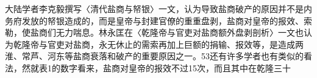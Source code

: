 \vfill
\begin{BookNotes}
\end{BookNotes}



大陆学者李克毅撰写〈清代盐商与帑银〉一文，认为导致盐商破产的原因并不是内务府发放的帑银造成的，而是皇帝与封建官僚的重重盘剥，盐商对皇帝的报效、索勒，使盐商们无力喘息。林永匡在〈乾隆帝与官吏对盐商额外盘剥剖析〉一文也认为乾隆帝与官吏对盐商，永无休止的需索再加上巨额的捐输、报效等，是造成两淮、常芦、河东等盐商衰落和破产的重要原因之一。53还有许多学者也有类似的看法，然就表1的数字看来，盐商对皇帝的报效不过15次，而且其中在乾隆三十

\vfill
\begin{BookNotes}
\end{BookNotes}



